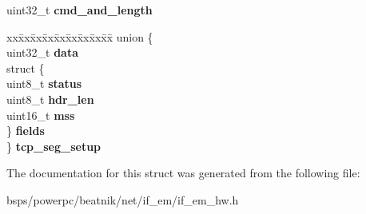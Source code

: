 \begin{DoxyCompactItemize}
\begin{tabbing}
\end{tabbing}\item 
\mbox{\label{structem__context__desc_a29a92a681b903978652f23c35a941d64}} 
uint32\+\_\+t {\bfseries cmd\+\_\+and\+\_\+length}
\item 
\mbox{\label{structem__context__desc_ae90db165066e56fdc30025d77a0c8d29}} 
\begin{tabbing}
xx\=xx\=xx\=xx\=xx\=xx\=xx\=xx\=xx\=\kill
union \{\\
\>uint32\_t {\bfseries data}\\
\>struct \{\\
\>\>uint8\_t {\bfseries status}\\
\>\>uint8\_t {\bfseries hdr\_len}\\
\>\>uint16\_t {\bfseries mss}\\
\>\} {\bfseries fields}\\
\} {\bfseries tcp\_seg\_setup}\\

\end{tabbing}\end{DoxyCompactItemize}


The documentation for this struct was generated from the following file\+:\begin{DoxyCompactItemize}
\item 
bsps/powerpc/beatnik/net/if\+\_\+em/if\+\_\+em\+\_\+hw.\+h\end{DoxyCompactItemize}
